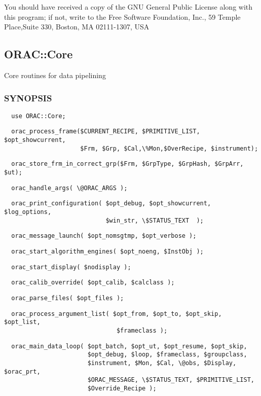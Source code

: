 You should have received a copy of the GNU General Public License along with
this program; if not, write to the Free Software Foundation, Inc., 59 Temple
Place,Suite 330, Boston, MA  02111-1307, USA

\subsection{ORAC::Core\label{ORAC::Core}}


Core routines for data pipelining

\subsubsection*{SYNOPSIS\label{ORAC::Core_SYNOPSIS}}
\begin{verbatim}
  use ORAC::Core;
\end{verbatim}
\begin{verbatim}
  orac_process_frame($CURRENT_RECIPE, $PRIMITIVE_LIST, $opt_showcurrent,
                     $Frm, $Grp, $Cal,\%Mon,$OverRecipe, $instrument);
\end{verbatim}
\begin{verbatim}
  orac_store_frm_in_correct_grp($Frm, $GrpType, $GrpHash, $GrpArr, $ut);
\end{verbatim}
\begin{verbatim}
  orac_handle_args( \@ORAC_ARGS );
\end{verbatim}
\begin{verbatim}
  orac_print_configuration( $opt_debug, $opt_showcurrent, $log_options,
                            $win_str, \$STATUS_TEXT  );
\end{verbatim}
\begin{verbatim}
  orac_message_launch( $opt_nomsgtmp, $opt_verbose );
\end{verbatim}
\begin{verbatim}
  orac_start_algorithm_engines( $opt_noeng, $InstObj );
\end{verbatim}
\begin{verbatim}
  orac_start_display( $nodisplay );
\end{verbatim}
\begin{verbatim}
  orac_calib_override( $opt_calib, $calclass );
\end{verbatim}
\begin{verbatim}
  orac_parse_files( $opt_files );
\end{verbatim}
\begin{verbatim}
  orac_process_argument_list( $opt_from, $opt_to, $opt_skip, $opt_list,
                               $frameclass );
\end{verbatim}
\begin{verbatim}
  orac_main_data_loop( $opt_batch, $opt_ut, $opt_resume, $opt_skip, 
                       $opt_debug, $loop, $frameclass, $groupclass, 
                       $instrument, $Mon, $Cal, \@obs, $Display, $orac_prt,
                       $ORAC_MESSAGE, \$STATUS_TEXT, $PRIMITIVE_LIST,
                       $Override_Recipe );
\end{verbatim}
